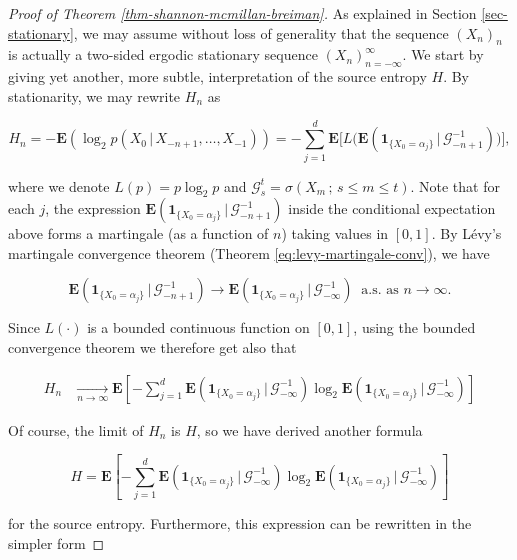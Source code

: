 \documentclass[11pt]{report}
\theoremstyle{plain}
\theoremstyle{definition}
\begin{document}
\begin{proof}[Proof of Theorem \ref{thm-shannon-mcmillan-breiman}]
As explained in Section \ref{sec-stationary}, we may assume without loss of generality that the sequence $(X_n)_n$ is actually a two-sided ergodic stationary sequence $(X_n)_{n=-\infty}^\infty$. We start by giving yet another, more subtle, interpretation of the source entropy $H$. By stationarity, we may rewrite $H_n$ as

\[
H_n = -\mathbf{E}(\log_2 p(X_0\,|\,X_{-n+1},\ldots,X_{-1})) = -\sum_{j=1}^d \mathbf{E}\Big[ L\big(
\mathbf{E}\left(\mathbf{1}_{\{X_0=\alpha_j\}}\,|\,\mathcal{G}_{-n+1}^{-1}\right) \big)\Big],
\]

where we denote $L(p) = p\log_2 p$ and $\mathcal{G}_s^t = \sigma(X_m\,;\, s\le m\le t)$. Note that for each $j$, the expression $\mathbf{E}\left(\mathbf{1}_{\{X_0=\alpha_j\}}\,|\,\mathcal{G}_{-n+1}^{-1}\right)$ inside the conditional expectation above forms a martingale (as a function of $n$) taking values in $[0,1]$. By L\'evy's martingale convergence theorem (Theorem \ref{eq:levy-martingale-conv}), we have

\[
\mathbf{E}\left(\mathbf{1}_{\{X_0=\alpha_j\}}\,|\,\mathcal{G}_{-n+1}^{-1}\right) \to \mathbf{E}\left(\mathbf{1}_{\{X_0=\alpha_j\}}\,|\,\mathcal{G}_{-\infty}^{-1}\right) \ \textrm{ a.s. as }n\to\infty.
\]

Since $L(\cdot)$ is a bounded continuous function on $[0,1]$, using the bounded convergence theorem we therefore get also that

\begin{align*} H_n
&\xrightarrow[n\to\infty]{} \mathbf{E}\left[ -\sum_{j=1}^d \mathbf{E}\left(\mathbf{1}_{\{X_0=\alpha_j\}}\,|\,\mathcal{G}_{-\infty}^{-1}\right)
\log_2 \mathbf{E}\left(\mathbf{1}_{\{X_0=\alpha_j\}}\,|\,\mathcal{G}_{-\infty}^{-1}\right)
\right]
\end{align*}

Of course, the limit of $H_n$ is $H$, so we have derived another formula

\begin{equation*} \tag{35}\label{eq:entropy-newformula}
H = \mathbf{E}\left[ -\sum_{j=1}^d \mathbf{E}\left(\mathbf{1}_{\{X_0=\alpha_j\}}\,|\,\mathcal{G}_{-\infty}^{-1}\right)
\log_2 \mathbf{E}\left(\mathbf{1}_{\{X_0=\alpha_j\}}\,|\,\mathcal{G}_{-\infty}^{-1}\right)
\right]
\end{equation*}

for the source entropy. Furthermore, this expression can be rewritten in the simpler form


\end{proof}
\end{document}
